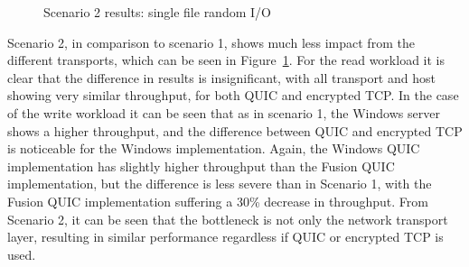 \documentclass[english, 12pt, a4paper, elec, utf8, a-2b, online]{aaltothesis}
\begin{document}
\begin{figure}[h]
\centering
{}

\caption{Scenario 2 results: single file random I/O}
\label{fig:scenario_2}
\end{figure}

Scenario 2, in comparison to scenario 1, shows much less impact from the different
transports, which can be seen in Figure~\ref{fig:scenario_2}. For the read workload it is
clear that the difference in results is insignificant, with all transport and host
showing very similar throughput, for both QUIC and encrypted TCP. In the case of the write workload it can be seen
that as in scenario 1, the Windows server shows a higher throughput, and the difference
between QUIC and encrypted TCP is noticeable for the Windows implementation. Again, the
Windows QUIC implementation has slightly higher throughput than the Fusion QUIC implementation,
but the difference is less severe than in Scenario 1, with the Fusion QUIC implementation
suffering a 30\% decrease in throughput. From Scenario 2, it can be seen that the bottleneck is
not only the network transport layer, resulting in similar performance regardless
if QUIC or encrypted TCP is used.
\end{document}
